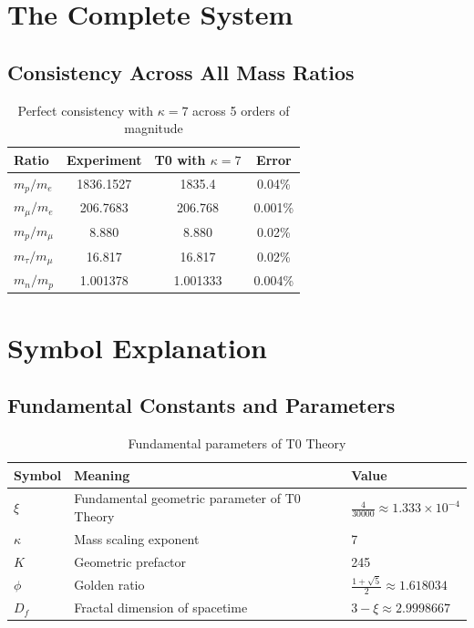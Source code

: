 	\section{The Complete System}
	
	\subsection{Consistency Across All Mass Ratios}
	
	\begin{table}[htbp]
		\centering
\begin{tabular}{lccc}
			\toprule
			\textbf{Ratio} & \textbf{Experiment} & \textbf{T0 with $\kappa=7$} & \textbf{Error} \\
			\midrule
			$m_p/m_e$ & 1836.1527 & 1835.4 & 0.04\% \\
			$m_{\mu}/m_e$ & 206.7683 & 206.768 & 0.001\% \\
			$m_p/m_{\mu}$ & 8.880 & 8.880 & 0.02\% \\
			$m_{\tau}/m_{\mu}$ & 16.817 & 16.817 & 0.02\% \\
			$m_n/m_p$ & 1.001378 & 1.001333 & 0.004\% \\
			\bottomrule
		\end{tabular}
		\caption{Perfect consistency with $\kappa = 7$ across 5 orders of magnitude}
	\end{table}
	
	\section{Symbol Explanation}
	
	\subsection{Fundamental Constants and Parameters}
	
	\begin{table}[htbp]
		\centering
		\begin{tabular}{p{3cm}p{8cm}p{3cm}}
			\toprule
			\textbf{Symbol} & \textbf{Meaning} & \textbf{Value} \\
			\midrule
			$\xi$ & Fundamental geometric parameter of T0 Theory & $\frac{4}{30000} \approx 1.333\times10^{-4}$ \\
			$\kappa$ & Mass scaling exponent & 7 \\
			$K$ & Geometric prefactor & 245 \\
			$\phi$ & Golden ratio & $\frac{1+\sqrt{5}}{2} \approx 1.618034$ \\
			$D_f$ & Fractal dimension of spacetime & $3 - \xi \approx 2.9998667$ \\
			\bottomrule
		\end{tabular}
		\caption{Fundamental parameters of T0 Theory}
	\end{table}
	
